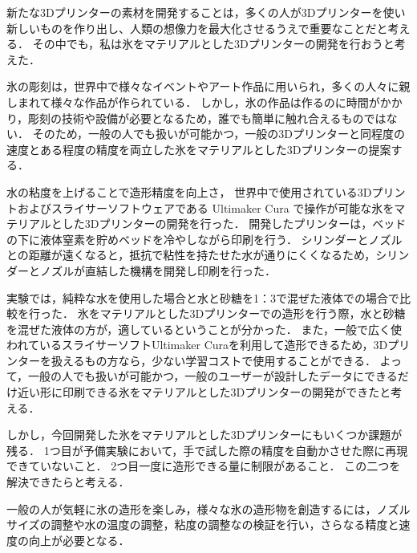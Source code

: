 新たな3Dプリンターの素材を開発することは，多くの人が3Dプリンターを使い新しいものを作り出し、人類の想像力を最大化させるうえで重要なことだと考える．
その中でも，私は氷をマテリアルとした3Dプリンターの開発を行おうと考えた．

氷の彫刻は，世界中で様々なイベントやアート作品に用いられ，多くの人々に親しまれて様々な作品が作られている．
しかし，氷の作品は作るのに時間がかかり，彫刻の技術や設備が必要となるため，誰でも簡単に触れ合えるものではない．
そのため，一般の人でも扱いが可能かつ，一般の3Dプリンターと同程度の速度とある程度の精度を両立した氷をマテリアルとした3Dプリンターの提案する．

水の粘度を上げることで造形精度を向上さ，
世界中で使用されている3Dプリントおよびスライサーソフトウェアである Ultimaker Cura で操作が可能な氷をマテリアルとした3Dプリンターの開発を行った．
開発したプリンターは，ベッドの下に液体窒素を貯めベッドを冷やしながら印刷を行う．
シリンダーとノズルとの距離が遠くなると，抵抗で粘性を持たせた水が通りにくくなるため，シリンダーとノズルが直結した機構を開発し印刷を行った．


実験では，純粋な水を使用した場合と水と砂糖を1：3で混ぜた液体での場合で比較を行った．
氷をマテリアルとした3Dプリンターでの造形を行う際，水と砂糖を混ぜた液体の方が，適しているということが分かった．
また，一般で広く使われているスライサーソフトUltimaker Curaを利用して造形できるため，3Dプリンターを扱えるもの方なら，少ない学習コストで使用することができる．
よって，一般の人でも扱いが可能かつ，一般のユーザーが設計したデータにできるだけ近い形に印刷できる氷をマテリアルとした3Dプリンターの開発ができたと考える．

しかし，今回開発した氷をマテリアルとした3Dプリンターにもいくつか課題が残る．
1つ目が予備実験において，手で試した際の精度を自動かさせた際に再現できていないこと．
2つ目一度に造形できる量に制限があること．
この二つを解決できたらと考える．

一般の人が気軽に氷の造形を楽しみ，様々な氷の造形物を創造するには，ノズルサイズの調整や水の温度の調整，粘度の調整なの検証を行い，さらなる精度と速度の向上が必要となる．



